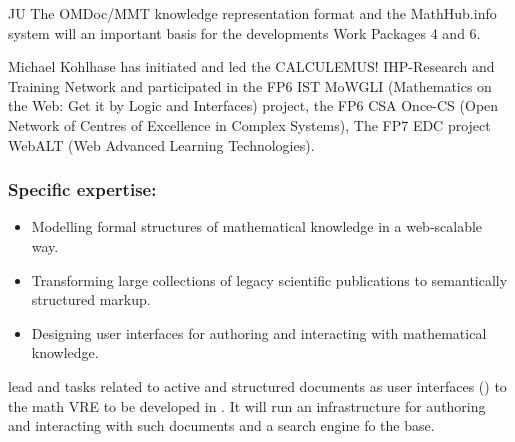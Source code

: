 \begin{sitedescription}{JU}
The \textsf{OMDoc/MMT} knowledge representation format and the \textsf{MathHub.info}
system will an important basis for the developments Work Packages 4 and 6.

Michael Kohlhase has initiated and led the CALCULEMUS! IHP-Research and Training Network
and participated in the FP6 IST MoWGLI (Mathematics on the Web: Get it by Logic and
Interfaces) project, the FP6 CSA Once-CS (Open Network of Centres of Excellence in Complex
Systems), The FP7 EDC project WebALT (Web Advanced Learning Technologies).

\subsubsection*{Specific expertise:}
\begin{itemize}
\item Modelling formal structures of mathematical knowledge in a web-scalable way.
\item Transforming large collections of legacy scientific publications to semantically
  structured markup.
\item Designing user interfaces for authoring and interacting with mathematical knowledge.
\end{itemize}

 lead  and tasks related to active and structured documents as
user interfaces () to the math VRE to be developed in \TheProject. It will run
an infrastructure for authoring and interacting with such documents and a search engine fo
the \DKS base. 
\end{sitedescription}


